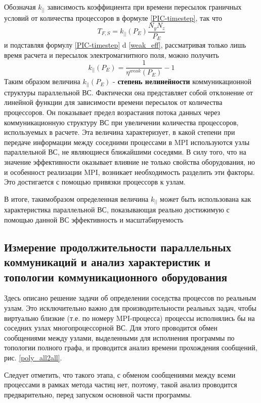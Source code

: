 		Обозначая $k_{||}$ зависимость коэффициента при времени пересылок граничных условий от количества процессоров в формуле \ref{PIC-timestep}, так что 
		\begin{equation}
		T_{F,S} = k_{||} (P_E) \frac{N_y N_z}{P_E}
		\end{equation} 
		и подставляя формулу \ref{PIC-timestep} d \ref{weak_eff}, рассматривая только лишь время расчета и пересылок электромагнитного поля, можно получить 
		\begin{equation}
		k_{||} (P_E) = \frac{1}{\eta^{weak}(P_E)} - 1
		\end{equation}	  
		Таким образом величина $k_{||} (P_E)$  - \textbf{степень нелинейности} коммуникационной структуры параллельной ВС. Фактически она представляет собой отклонение от линейной функции для зависимости времени пересылок от количества процессоров. Он показывает предел возрастания потока данных через коммуникационную структуру ВС при увеличении количества процессоров, используемых в расчете. Эта величина характеризует, в какой степени при передаче информации между соседними процессами в MPI используются узлы параллельной ВС, не являющиеся ближайшими соседями. В силу того, что на значение эффективности оказывает влияние не только свойства оборудования, но и особенност реализации MPI, возникает необходимость разделить эти факторы. Это достигается с помощью привязки процессорв к узлам. 
		
		В итоге, такимобразом определенная  величина $k_{||} $ может быть использована как характеристика параллельной ВС, показывающая реально достижимую с помощью данной ВС эффективность и масштабируемость   
		
		\subsection{Измерение продолжительности параллельных коммуникаций и анализ характеристик и топологии коммуникационного оборудования}
		Здесь описано решение задачи об определении соседства процессов по реальным узлам. Это исключительно важно для производительности реальных задач, чтобы виртуально близкие (т.е. по номеру MPI-процесса) процессы исполнялись бы на соседних узлах многопроцессорной ВС. Для этого проводится обмен сообщениями между узлами, выделенными 
		для исполнения программы по топологии полного графа, и проводится анализ времени прохождения сообщений, рис. \ref{poly_all2all}.  
		
		Следует отметить, что такого этапа, с обменом сообщениями между всеми процессами в рамках метода частиц нет, поэтому, такой анализ проводится предварительно, перед запуском основной части программы.

